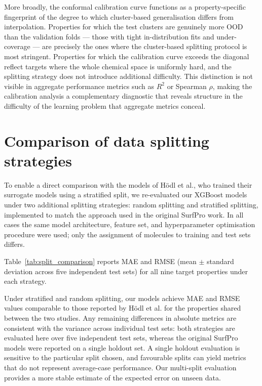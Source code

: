 \documentclass[11pt]{aime}
\begin{document}
More broadly, the conformal calibration curve functions as a property-specific fingerprint of the degree to which cluster-based generalisation differs from interpolation.
Properties for which the test clusters are genuinely more OOD than the validation folds --- those with tight in-distribution fits and under-coverage --- are precisely the ones where the cluster-based splitting protocol is most stringent.
Properties for which the calibration curve exceeds the diagonal reflect targets where the whole chemical space is uniformly hard, and the splitting strategy does not introduce additional difficulty.
This distinction is not visible in aggregate performance metrics such as $R^2$ or Spearman $\rho$, making the calibration analysis a complementary diagnostic that reveals structure in the difficulty of the learning problem that aggregate metrics conceal.


\section{Comparison of data splitting strategies}
\label{app:split_comparison}

To enable a direct comparison with the models of Hödl et al.\cite{hodl_surfpro_2025}, who trained their surrogate models using a stratified split, we re-evaluated our XGBoost models under two additional splitting strategies: random splitting and stratified splitting, implemented to match the approach used in the original SurfPro work. In all cases the same model architecture, feature set, and hyperparameter optimisation procedure were used; only the assignment of molecules to training and test sets differs.

Table~\ref{tab:split_comparison} reports MAE and RMSE (mean $\pm$ standard deviation across five independent test sets) for all nine target properties under each strategy.

Under stratified and random splitting, our models achieve MAE and RMSE values comparable to those reported by Hödl et al.\cite{hodl_surfpro_2025} for the properties shared between the two studies. Any remaining differences in absolute metrics are consistent with the variance across individual test sets: both strategies are evaluated here over five independent test sets, whereas the original SurfPro models were reported on a single holdout set. A single holdout evaluation is sensitive to the particular split chosen, and favourable splits can yield metrics that do not represent average-case performance. Our multi-split evaluation provides a more stable estimate of the expected error on unseen data.
\end{document}
